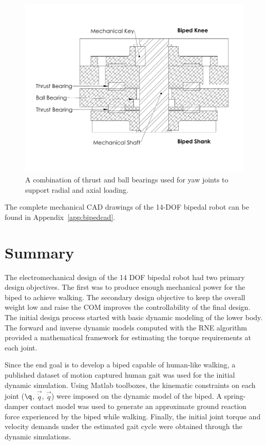 \begin{figure}[!ht]
	\begin{center}
    \includegraphics[trim = 5mm 34mm 5mm 25mm,clip,width=15cm]{fig/design/yawbearing.pdf}
	\end{center}
  \caption{A combination of thrust and ball bearings used for yaw joints to support radial and axial loading.}
\label{fig:yawbearing}
\end{figure}

The complete mechanical CAD drawings of the 14-DOF bipedal robot can be found in Appendix~\ref{app:bipedcad}. 



\section{Summary} %
\label{sec:design_summary}
The electromechanical design of the 14 DOF bipedal robot had two primary design objectives. The first was to produce enough mechanical power for the biped to achieve walking. The secondary design objective to keep the overall weight low and raise the COM improves the controllability of the final design. The initial design process started with basic dynamic modeling of the lower body. The forward and inverse dynamic models computed with the RNE algorithm provided a mathematical framework for estimating the torque requirements at each joint. 

Since the end goal is to develop a biped capable of human-like walking, a published dataset of motion captured human gait was used for the initial dynamic simulation. Using Matlab toolboxes, the kinematic constraints on each joint ($\q$, $\vec{\dot{q}}$, $\vec{\ddot{q}}$) were imposed on the dynamic model of the biped. A spring-damper contact model was used to generate an approximate ground reaction force experienced by the biped while walking. Finally, the initial joint torque and velocity demands under the estimated gait cycle were obtained through the dynamic simulations. 


